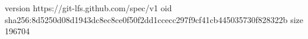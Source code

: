 version https://git-lfs.github.com/spec/v1
oid sha256:8d5250d08d1943dc8ec8ce0f50f2dd1ccecc297f9cf41cb445035730f828322b
size 196704
